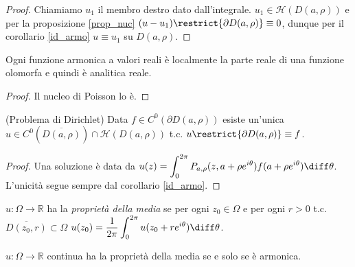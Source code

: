\begin{proof}
  Chiamiamo $u_1$ il membro destro dato dall'integrale. $u_1 \in \mathcal{H}(D(a,\rho))$ e per la proposizione \ref{prop_nuc} $(u-u_1)\restrict{\partial D(a, \rho)} \equiv 0$, dunque per il corollario \ref{id_armo} $u \equiv u_1$ su $D(a, \rho)$.
\end{proof}

\begin{cor}
  Ogni funzione armonica a valori reali è localmente la parte reale di una funzione olomorfa e quindi è analitica reale.
\end{cor}

\begin{proof}
  Il nucleo di Poisson lo è.
\end{proof}

\begin{cor}
  (Problema di Dirichlet) Data $f \in C^0(\partial D(a,\rho))$ esiste un'unica $u \in C^0(\overline{D(a,\rho)}) \cap \mathcal{H}(D(a,\rho))$ t.c. $u\restrict{\partial D(a,\rho)} \equiv f$.
\end{cor}

\begin{proof}
  Una soluzione è data da $\displaystyle u(z)=\int_0^{2\pi} P_{a,\rho}(z,a+\rho e^{i\theta})f(a+\rho e^{i\theta})\diff\theta$. L'unicità segue sempre dal corollario \ref{id_armo}.
\end{proof}

\begin{defn}
  $u: \Omega \longrightarrow \mathbb{R}$ ha la \textit{proprietà della media} se per ogni $z_0 \in \Omega$ e per ogni $r>0$ t.c. $\overline{D(z_0,r)} \subset \Omega$ $\displaystyle u(z_0)=\frac{1}{2\pi} \int_0^{2\pi} u(z_0+re^{i\theta})\diff\theta$.
\end{defn}

\begin{prop}
  $u:\Omega \longrightarrow \mathbb{R}$ continua ha la proprietà della media se e solo se è armonica.
\end{prop}

